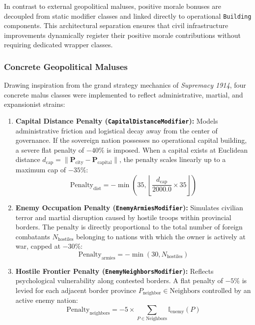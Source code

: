 In contrast to external geopolitical maluses, positive morale bonuses are decoupled from static modifier classes and linked directly to operational \texttt{Building} components. This architectural separation ensures that civil infrastructure improvements dynamically register their positive morale contributions without requiring dedicated wrapper classes.

\subsubsection{Concrete Geopolitical Maluses}
Drawing inspiration from the grand strategy mechanics of \textit{Supremacy 1914}, four concrete malus classes were implemented to reflect administrative, martial, and expansionist strains:

\begin{enumerate}
    \item \textbf{Capital Distance Penalty (\texttt{CapitalDistanceModifier}):} Models administrative friction and logistical decay away from the center of governance. If the sovereign nation possesses no operational capital building, a severe flat penalty of $-40\%$ is imposed. When a capital exists at Euclidean distance $d_{\text{cap}} = \|\mathbf{P}_{\text{city}} - \mathbf{P}_{\text{capital}}\|$, the penalty scales linearly up to a maximum cap of $-35\%$:
    \begin{equation}
        \text{Penalty}_{\text{dist}} = -\min\left(35, \left\lfloor \frac{d_{\text{cap}}}{2000.0} \times 35 \right\rfloor\right)
    \end{equation}

    \item \textbf{Enemy Occupation Penalty (\texttt{EnemyArmiesModifier}):} Simulates civilian terror and martial disruption caused by hostile troops within provincial borders. The penalty is directly proportional to the total number of foreign combatants $N_{\text{hostiles}}$ belonging to nations with which the owner is actively at war, capped at $-30\%$:
    \begin{equation}
        \text{Penalty}_{\text{armies}} = -\min(30, N_{\text{hostiles}})
    \end{equation}

    \item \textbf{Hostile Frontier Penalty (\texttt{EnemyNeighborsModifier}):} Reflects psychological vulnerability along contested borders. A flat penalty of $-5\%$ is levied for each adjacent border province $P_{\text{neighbor}} \in \text{Neighbors}$ controlled by an active enemy nation:
    \begin{equation}
        \text{Penalty}_{\text{neighbors}} = -5 \times \sum_{P \in \text{Neighbors}} \mathbb{I}_{\text{enemy}}(P)
    \end{equation}


\end{enumerate}
